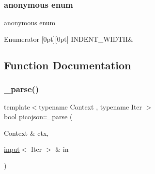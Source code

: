 \subsubsection{\texorpdfstring{anonymous enum}{anonymous enum}}
{\footnotesize\ttfamily anonymous enum}

\begin{DoxyEnumFields}{Enumerator}
[0pt][0pt]{}\hypertarget{namespacepicojson_ae3fd37cd4ad93e8b91a1dd552487eec4a2aee14a2b66d94b58c64c66edd8ed9b1}{}\label{namespacepicojson_ae3fd37cd4ad93e8b91a1dd552487eec4a2aee14a2b66d94b58c64c66edd8ed9b1} 
I\+N\+D\+E\+N\+T\+\_\+\+W\+I\+D\+TH&\\
\hline

\end{DoxyEnumFields}


\subsection{Function Documentation}
\hypertarget{namespacepicojson_aed024a6a1c8d8982a38c4a7fcefde221}{}\label{namespacepicojson_aed024a6a1c8d8982a38c4a7fcefde221} 
\subsubsection{\texorpdfstring{\+\_\+parse()}{\_parse()}\hspace{0.1cm}{\footnotesize\ttfamily [1/2]}}
{\footnotesize\ttfamily template$<$typename Context , typename Iter $>$ \\
bool picojson\+::\+\_\+parse (\begin{DoxyParamCaption}\item[{Context \&}]{ctx,  }\item[{\hyperlink{classpicojson_1_1input}{input}$<$ Iter $>$ \&}]{in }\end{DoxyParamCaption})\hspace{0.3cm}{\ttfamily [inline]}}

\hypertarget{namespacepicojson_a01c0a3f35d42282ba913375737c8e259}{}\label{namespacepicojson_a01c0a3f35d42282ba913375737c8e259} 

